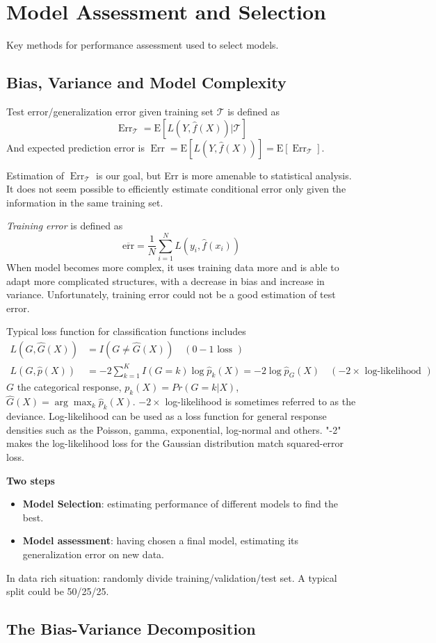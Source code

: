 \chapter{Model Assessment and Selection}
Key methods for performance assessment used to select models. 

\section{Bias, Variance and Model Complexity}
Test error/generalization error given training set $\mathcal{T}$ is defined as 
\begin{equation*}
    \operatorname{Err}_{\mathcal{T}}=\mathrm{E}[L(Y, \hat{f}(X)) | \mathcal{T}]
\end{equation*}
And expected prediction error is $\operatorname{Err}
=\mathrm{E}[L(Y, \hat{f}(X))]=\mathrm{E}\left[\operatorname{Err}_{\mathcal{T}}\right]$. 

Estimation of $\operatorname{Err}_{\mathcal{T}}$ is our goal, but Err is more amenable to statistical analysis. It does not seem possible to efficiently estimate conditional error only given the information in the same training set. 

\textit{Training error} is defined as
\begin{equation*}
    \overline{\mathrm{err}}=\frac{1}{N} \sum_{i=1}^{N} L\left(y_{i}, \hat{f}\left(x_{i}\right)\right)
\end{equation*}
When model becomes more complex, it uses training data more and is able to adapt more complicated structures, with a decrease in bias and increase in variance. Unfortunately, training error could not be a good estimation of test error. 

Typical loss function for classification functions includes
\begin{align*}
L(G, \hat{G}(X)) &=I(G \neq \hat{G}(X)) \quad(0-1 \text { loss }) \\ 
L(G, \hat{p}(X)) &=-2 \sum_{k=1}^{K} I(G=k) \log \hat{p}_{k}(X)=-2 \log \hat{p}_{G}(X) \quad(-2 \times \text { log-likelihood })
\end{align*}
$G$ the categorical response, $p_k(X)=Pr(G=k|X)$, $\hat{G}(X)=\arg\max_k\hat{p}_k(X)$. 
$-2 \times$ log-likelihood is sometimes referred to as the deviance. Log-likelihood can be used as a loss function for general response densities such as the Poisson, gamma, exponential, log-normal and others. "-2" makes the log-likelihood loss for the Gaussian distribution match squared-error loss. 

\noindent\textbf{Two steps}
\begin{itemize}
\item \textbf{Model Selection}: estimating performance of different models to find the best. 
\item \textbf{Model assessment}: having chosen a final model, estimating its generalization error on new data. 
\end{itemize}
In data rich situation: randomly divide training/validation/test set. A typical split could be 
50/25/25. 

\section{The Bias-Variance Decomposition}
